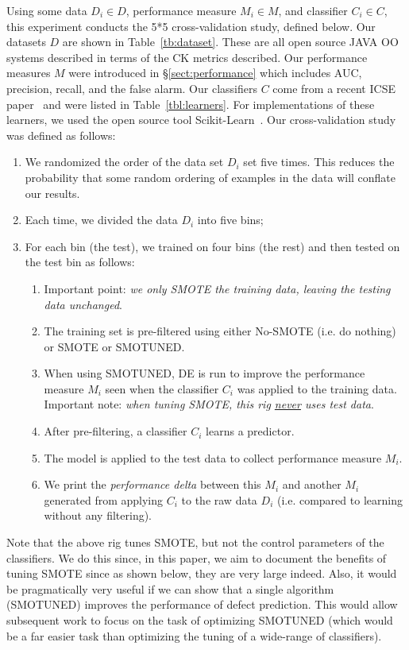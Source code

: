 \documentclass[10pt,conference]{IEEEtran}
\newcommand{\be}{\begin{enumerate}}
\newcommand{\ee}{\end{enumerate}}
\theoremstyle{break}
\theoremstyle{break}
\newcommand{\tion}[1]{{\S}\ref{sect:#1}}
\newcommand{\sma}{{\sc SMOTE}}
\newcommand{\smb}{{\sc SMOTUNED}}
\begin{document}
Using some data $D_i \in D$, performance measure $M_i \in M$, and classifier $C_i \in C$,
this experiment conducts the 5*5 cross-validation study, defined below.
Our datasets  $D$ are shown in  Table~\ref{tb:dataset}. These are all open source
JAVA OO systems described in terms of the CK metrics described. 
Our performance measures $M$ were introduced in \tion{performance}
which includes   AUC, precision, recall, and the  false alarm. 
Our classifiers
 $C$  come from a  recent ICSE paper~\cite{ghotra2015revisiting}
and were listed in  Table~\ref{tbl:learners}.
For  implementations 
of these learners,
we used  the open source tool
Scikit-Learn~\cite{pedregosa2011scikit}.
Our  cross-validation study~\cite{refaeilzadeh2009cross} was defined as follows:
\be
\item We randomized the order of the data set $D_i$ set five times. This reduces the probability
that some random ordering of examples in the data will conflate our results.
\item Each time, we divided the data $D_i$ into five bins;
\item For each bin (the test), we trained on four bins (the rest) and then tested
on the test bin as follows:
\be
\item
Important point: {\em we only {\sma} the training data,  leaving
the  testing data unchanged}.
\item
The  training set is pre-filtered using either No-SMOTE (i.e. do nothing) or  {\sma} or {\smb}.  
\item
When using {\smb}, DE is  run to  improve
the performance measure $M_i$ seen when the classifier $C_i$ was applied to the training data.
Important note: {\em when tuning {\sma}, this rig \underline{{\em never}} uses test data}.
\item
After pre-filtering, a classifier $C_i$  learns a predictor.
\item
The model is applied to the test data to collect performance measure $M_i$. 
\item 
We print the {\em performance delta} between this $M_i$ and another  $M_i$
generated from applying $C_i$ to the raw data $D_i$ (i.e. compared to learning
without any filtering).
\ee
\ee


   
   
Note that the above rig tunes {\sma}, but not the control parameters of the classifiers.
We do this since, in this paper,  we aim to document the   benefits of tuning {\sma} since as shown below, they are very large indeed. Also, it would be  pragmatically very useful if we can show that a single algorithm ({\smb})  improves the performance of defect prediction. This would allow
subsequent work to focus on the task of optimizing  {\smb} (which would be a far easier
task than optimizing the tuning of a wide-range of classifiers). 
 
\end{document}
